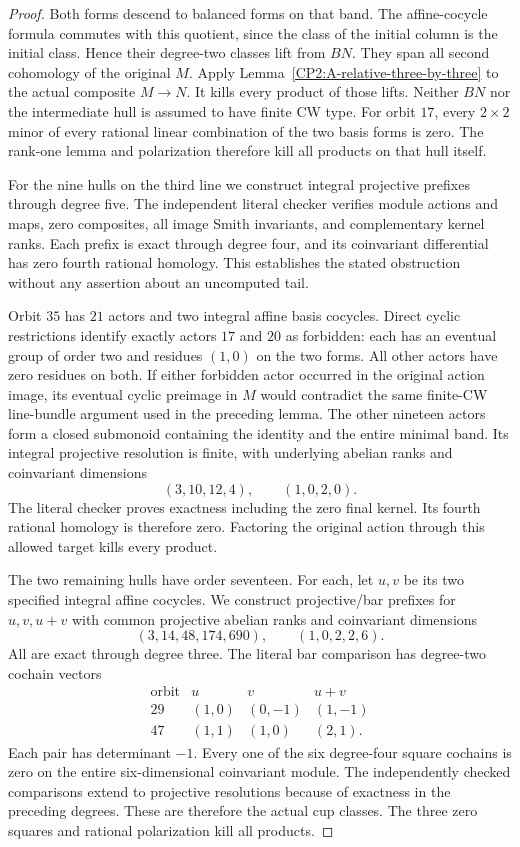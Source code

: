 \begin{proof}
Both forms descend to balanced forms on that band. The
affine-cocycle formula commutes with this quotient, since the
class of the initial column is the initial class. Hence their
degree-two classes lift from $BN$. They span all second
cohomology of the original $M$. Apply
Lemma~\ref{CP2:A-relative-three-by-three} to the actual
composite $M\to N$. It kills every product of those lifts.
Neither $BN$ nor the intermediate hull is assumed to have
finite CW type. For orbit $17$, every $2\times2$ minor of
every rational linear combination of the two basis forms
is zero. The rank-one lemma and polarization therefore
kill all products on that hull itself.

For the nine hulls on the third line we construct integral
projective prefixes through degree five. The independent
literal checker verifies module actions and maps, zero
composites, all image Smith invariants, and complementary
kernel ranks. Each prefix is exact through degree four,
and its coinvariant differential has zero fourth rational
homology. This establishes the stated obstruction without
any assertion about an uncomputed tail.

Orbit $35$ has $21$ actors and two integral affine basis
cocycles. Direct cyclic restrictions identify exactly
actors $17$ and $20$ as forbidden: each has an eventual
group of order two and residues $(1,0)$ on the two forms.
All other actors have zero residues on both. If either
forbidden actor occurred in the original action image,
its eventual cyclic preimage in $M$ would contradict the
same finite-CW line-bundle argument used in the preceding
lemma. The other nineteen actors form a closed submonoid
containing the identity and the entire minimal band.
Its integral projective resolution is finite, with
underlying abelian ranks and coinvariant dimensions
\[
 (3,10,12,4),\qquad (1,0,2,0).
\]
The literal checker proves exactness including the zero
final kernel. Its fourth rational homology is therefore
zero. Factoring the original action through this allowed
target kills every product.

The two remaining hulls have order seventeen. For each,
let $u,v$ be its two specified integral affine cocycles.
We construct projective/bar prefixes for $u,v,u+v$ with
common projective abelian ranks and coinvariant dimensions
\[
 (3,14,48,174,690),\qquad (1,0,2,2,6).
\]
All are exact through degree three. The literal bar
comparison has degree-two cochain vectors
\[
\begin{array}{c|ccc}
\text{orbit}&u&v&u+v\\\hline
29&(1,0)&(0,-1)&(1,-1)\\
47&(1,1)&(1,0)&(2,1).
\end{array}
\]
Each pair has determinant $-1$. Every one of the six
degree-four square cochains is zero on the entire
six-dimensional coinvariant module. The independently
checked comparisons extend to projective resolutions
because of exactness in the preceding degrees. These
are therefore the actual cup classes. The three zero
squares and rational polarization kill all products.


\end{proof}
